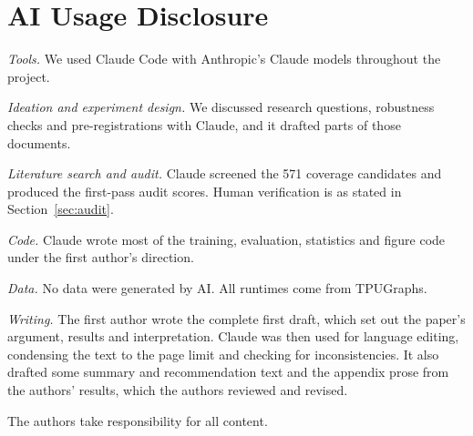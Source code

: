 \documentclass{article}
\begin{document}




\section*{AI Usage Disclosure}
\textit{Tools.} We used Claude Code with Anthropic's Claude models throughout the project.

\textit{Ideation and experiment design.} We discussed research questions, robustness checks and
pre-registrations with Claude, and it drafted parts of those documents.

\textit{Literature search and audit.} Claude screened the 571 coverage candidates and produced the
first-pass audit scores. Human verification is as stated in Section~\ref{sec:audit}.

\textit{Code.} Claude wrote most of the training, evaluation, statistics and figure code under the
first author's direction.

\textit{Data.} No data were generated by AI. All runtimes come from TPUGraphs.

\textit{Writing.} The first author wrote the complete first draft, which set out the paper's argument,
results and interpretation. Claude was then used for language editing, condensing the text to the page
limit and checking for inconsistencies. It also drafted some summary and recommendation text and the
appendix prose from the authors' results, which the authors reviewed and revised.

The authors take responsibility for all content.
\end{document}
